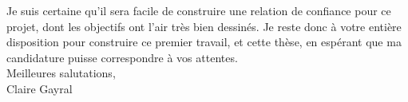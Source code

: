 \documentclass[a4paper,11pt]{article}
\begin{document}
Je suis certaine qu'il sera facile de construire une relation de confiance pour ce projet, dont les objectifs ont l'air très bien dessinés. %
Je reste donc à votre entière disposition pour construire ce premier travail, et cette thèse, en espérant que ma candidature puisse correspondre à vos attentes. \\

Meilleures salutations, \\

Claire Gayral
\end{document}

